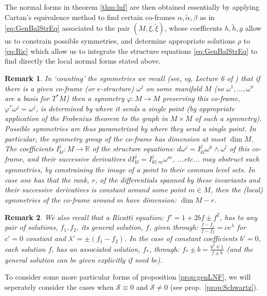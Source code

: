 \documentclass[10pt]{amsart}
\newcommand{\R}{\mathbb{R}}
\newcommand{\fe}{\varphi}
\theoremstyle{definition}
\newtheorem{rem}{Remark}
\begin{document}
The normal forms in theorem \ref{thm:lnf} are then obtained essentially by applying Cartan's equivalence method to find certain co-frames $\alpha, \tilde\alpha, \beta$ as in \eqref{eq:GenBalStrEq} associated to the pair $(M, \xi, \tilde \xi)$, whose coefficents $h,\tilde h, g$ allow us to constrain possible symmetries, and determine appropriate solutions $\rho$ to \eqref{eq:Ric} which allow us to integrate the structure equations \eqref{eq:GenBalStrEq} to find directly the local normal forms stated above.

\begin{rem}\label{rem:counting}
    {\em In `counting' the symmetries we recall (see, eg, Lecture 6 of \cite{Gard}) that if there is a given co-frame (or $e$-structure) $\omega^j$ on some manifold $M$ (so $\omega^1, ..., \omega^n$ are a basis for $T^*M$) then a symmetry $\fe:M\to M$ preserving this co-frame, $\fe^*\omega^j=\omega^j$, is determined by where it sends a single point (by appropriate application of the Frobenius theorem to the graph in $M\times M$ of such a symmetry). Possible symmetries are thus parametrized by where they send a single point. In particular, the symmetry group of the co-frame has dimension at most $\dim M$. The coefficients $I_{kl}^j:M\to \R$ of the structure equations: $d\omega^j = I_{kl}^j\omega^k\wedge\omega^l$ of this co-frame, and their successive derivatives $dI_{kl}^j = I_{kl;m}^j\omega^m$, ...etc... may obstruct such symmetries, by constraining the image of a point to their common level sets. In case one has that the rank, $r$, of the differentials spanned by these invariants and their successive derivatives is constant around some point $m\in M$, then the (local) symmetries of the co-frame around $m$ have dimension: $\dim M - r$.}
\end{rem}

\begin{rem}
    {\em We also recall that a Ricatti equation: $f' = 1 + 2b f \pm f^2$, has to any pair of solutions, $f_1, f_2$, its general solution, $f$, given through: $\frac{f-f_1}{f-f_2} = ce^\lambda$ for $c' = 0$ constant and $\lambda' = \pm (f_1 - f_2)$. In the case of constant coefficients $b'= 0$, each solution $f$, has an associated solution, $f_*$, through: $f_* \pm b  = \frac{b^2 \mp 1}{f \pm b}$ (and the general solution can be given explicitly if need be).}
\end{rem}

To consider some more particular forms of proposition \ref{prop:genLNF}, we will seperately consider the cases when $\mathcal{S}\equiv 0$ and $\mathcal{S}\ne 0$ (see prop.~\ref{prop:Schwartz}).
\end{document}
